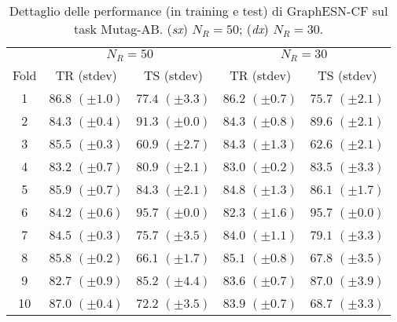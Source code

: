 \begin{table}[tbph]
\footnotesize
\caption[Dettaglio performance: GraphESN-CF su Mutag-AB]{Dettaglio delle performance (in training e test) di GraphESN-CF sul task Mutag-AB. (\emph{sx}) $N_R=50$; (\emph{dx}) $N_R=30$.}
\label{app:esp:Mutag-AB-CF}
\centering
\begin{tabular}{c*{4}{c}}
\toprule
& \multicolumn{2}{c}{$N_R=50$} & \multicolumn{2}{c}{$N_R=30$}\\
Fold & TR (stdev) & TS (stdev) & TR (stdev) & TS (stdev)\\
\midrule
1 & $86.8$ $(\pm 1.0)$ & $77.4$ $(\pm 3.3)$ & $86.2$ $(\pm 0.7)$ & $75.7$ $(\pm 2.1)$\\
2 & $84.3$ $(\pm 0.4)$ & $91.3$ $(\pm 0.0)$ & $84.3$ $(\pm 0.8)$ & $89.6$ $(\pm 2.1)$\\
3 & $85.5$ $(\pm 0.3)$ & $60.9$ $(\pm 2.7)$ & $84.3$ $(\pm 1.3)$ & $62.6$ $(\pm 2.1)$\\
4 & $83.2$ $(\pm 0.7)$ & $80.9$ $(\pm 2.1)$ & $83.0$ $(\pm 0.2)$ & $83.5$ $(\pm 3.3)$\\
5 & $85.9$ $(\pm 0.7)$ & $84.3$ $(\pm 2.1)$ & $84.8$ $(\pm 1.3)$ & $86.1$ $(\pm 1.7)$\\
6 & $84.2$ $(\pm 0.6)$ & $95.7$ $(\pm 0.0)$ & $82.3$ $(\pm 1.6)$ & $95.7$ $(\pm 0.0)$\\
7 & $84.5$ $(\pm 0.3)$ & $75.7$ $(\pm 3.5)$ & $84.0$ $(\pm 1.1)$ & $79.1$ $(\pm 3.3)$\\
8 & $85.8$ $(\pm 0.2)$ & $66.1$ $(\pm 1.7)$ & $85.1$ $(\pm 0.8)$ & $67.8$ $(\pm 3.5)$\\
9 & $82.7$ $(\pm 0.9)$ & $85.2$ $(\pm 4.4)$ & $83.6$ $(\pm 0.7)$ & $87.0$ $(\pm 3.9)$\\
10 & $87.0$ $(\pm 0.4)$ & $72.2$ $(\pm 3.5)$ & $83.9$ $(\pm 0.7)$ & $68.7$ $(\pm 3.3)$\\
\bottomrule
\end{tabular}
\end{table}



